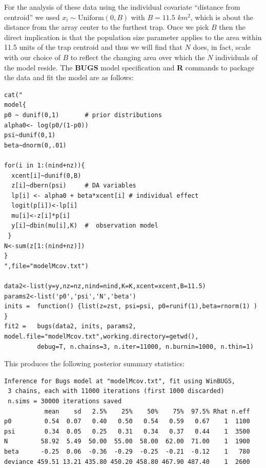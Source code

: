 For the analysis of these data using the individual covariate
``distance from centroid''
we used $x_{i} \sim \mbox{Uniform}(0,B)$
with $B = 11.5$ $km^2$, which is about the distance from the
array center to the furthest trap.  Once we pick $B$ then the
direct implication is that the population size parameter applies to
the area within 11.5 units of the trap centroid and thus we will find
that $N$ does, in fact, scale with our choice of $B$ to reflect
the changing area over which the $N$ individuals of the model reside.
The {\bf BUGS} model specification and {\bf R} commands to package the
data and fit the model are as follows:
{\small
\begin{verbatim}
cat("
model{
p0 ~ dunif(0,1)       # prior distributions
alpha0<- log(p0/(1-p0))
psi~dunif(0,1)
beta~dnorm(0,.01)

for(i in 1:(nind+nz)){
  xcent[i]~dunif(0,B)
  z[i]~dbern(psi)     # DA variables
  lp[i] <- alpha0 + beta*xcent[i] # individual effect
  logit(p[i])<-lp[i]
  mu[i]<-z[i]*p[i]
  y[i]~dbin(mu[i],K)  #  observation model
 }
N<-sum(z[1:(nind+nz)])
}
",file="modelMcov.txt")

data2<-list(y=y,nz=nz,nind=nind,K=K,xcent=xcent,B=11.5)
params2<-list('p0','psi','N','beta')
inits =  function() {list(z=zst, psi=psi, p0=runif(1),beta=rnorm(1) ) }
fit2 =   bugs(data2, inits, params2, model.file="modelMcov.txt",working.directory=getwd(),
         debug=T, n.chains=3, n.iter=11000, n.burnin=1000, n.thin=1)
\end{verbatim}
}
This produces the following posterior summary statistics:
{\small
\begin{verbatim}
Inference for Bugs model at "modelMcov.txt", fit using WinBUGS,
 3 chains, each with 11000 iterations (first 1000 discarded)
 n.sims = 30000 iterations saved
           mean    sd   2.5%    25%    50%    75%  97.5% Rhat n.eff
p0         0.54  0.07   0.40   0.50   0.54   0.59   0.67    1  1100
psi        0.34  0.05   0.25   0.31   0.34   0.37   0.44    1  3500
N         58.92  5.49  50.00  55.00  58.00  62.00  71.00    1  1900
beta      -0.25  0.06  -0.36  -0.29  -0.25  -0.21  -0.12    1   780
deviance 459.51 13.21 435.80 450.20 458.80 467.90 487.40    1  2600
\end{verbatim}
}

